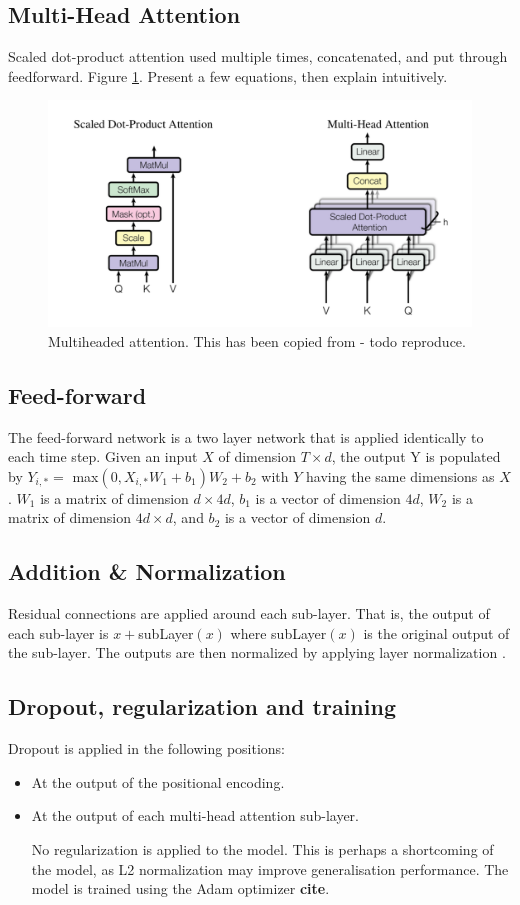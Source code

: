 \documentclass[conference]{IEEEtran}
\begin{document}
\subsection{Multi-Head Attention}
Scaled dot-product attention used multiple times, concatenated, and put through feedforward.
Figure \ref{fig:multihead}.
Present a few equations, then explain intuitively.

\begin{figure}[htbp]
	\centerline{\includegraphics[width=.35\textwidth]{images/multihead_attention_vaswani_copied.png}}
	\caption{Multiheaded attention. This has been copied from \cite{Vaswani2017} - todo reproduce.}
	\label{fig:multihead}
\end{figure}

\subsection{Feed-forward}
The feed-forward network is a two layer network that is applied identically to each time step.
Given an input $X$ of dimension $T \times d$, the output Y is populated by $Y_{i,*} = $ max$(0, X_{i,*}  W_1 + b_1)  W_2 + b_2$ with $Y$ having the same dimensions as $X$.
$W_1$ is a matrix of dimension $d \times 4d$, $b_1$ is a vector of dimension $4d$, $W_2$ is a matrix of dimension $4d \times d$, and $b_2$ is a vector of dimension $d$.

\subsection{Addition \& Normalization}
Residual connections \cite{He2015} are applied around each sub-layer.
That is, the output of each sub-layer is $x + $subLayer$(x)$ where subLayer$(x)$ is the original output of the sub-layer.
The outputs are then normalized by applying layer normalization \cite{Ba2016}.

\subsection{Dropout, regularization and training}
Dropout is applied in the following positions:
\begin{itemize}
	\item At the output of the positional encoding. 
	\item At the output of each multi-head attention sub-layer.
	
No regularization is applied to the model. 
This is perhaps a shortcoming of the model, as L2 normalization may improve generalisation performance.
The model is trained using the Adam optimizer \textbf{cite}.
\end{itemize}
\end{document}
